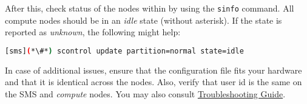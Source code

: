 
After this, check status of the nodes within \SLURM{} by using the
\texttt{sinfo} command. All compute nodes should be in an {\em idle} state
(without asterisk). If the state is reported as {\em unknown}, the following
might help:

\begin{lstlisting}[language=bash]
[sms](*\#*) scontrol update partition=normal state=idle
\end{lstlisting}

In case of additional \SLURM{} issues, ensure that the configuration file fits
your hardware and that it is identical across the nodes. Also, verify
that \SLURM{} user id is the same on the SMS and {\em compute} nodes. You may
also consult
\href{https://slurm.schedmd.com/troubleshoot.html}{\color{blue}\SLURM{}
Troubleshooting Guide}.
